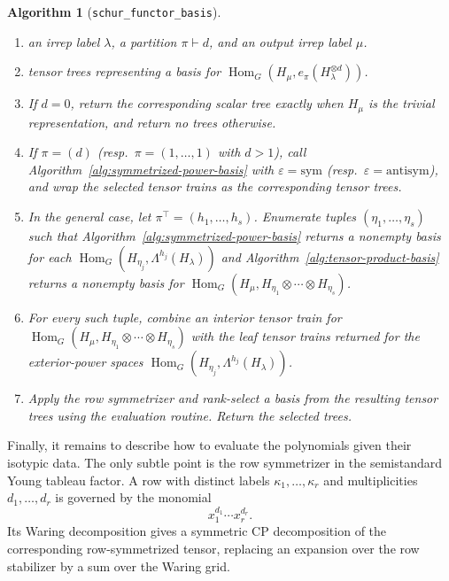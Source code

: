 \documentclass[11pt]{article}
\newcommand{\HomG}[2]{\operatorname{Hom}_G\!\left(#1,#2\right)}
\newtheorem{algorithm}[theorem]{Algorithm}
\theoremstyle{definition}
\begin{document}
\begin{algorithm}[\texttt{schur\_functor\_basis}]\label{alg:schur-functor-basis}\label{alg:appendix-leaf-assembly}
  \phantom{}
  \begin{enumerate}[label=\textbf{Step \arabic*.},leftmargin=2.8cm]
    \item[\textbf{Input:}] an irrep label $\lambda$, a partition $\pi\vdash d$, and an output irrep label $\mu$.
    \item[\textbf{Output:}] tensor trees representing a basis for $\HomG{H_\mu}{e_\pi(H_\lambda^{\otimes d})}$.
    \item If $d=0$, return the corresponding scalar tree exactly when $H_\mu$ is the trivial representation, and return no trees otherwise.
    \item If $\pi=(d)$ (resp.~$\pi=(1,\dots,1)$ with $d>1$), call Algorithm~\ref{alg:symmetrized-power-basis} with $\varepsilon=\mathrm{sym}$ (resp.~$\varepsilon=\mathrm{antisym}$), and wrap the selected tensor trains as the corresponding tensor trees.
    \item In the general case, let $\pi^\top=(h_1,\dots,h_s)$.  Enumerate tuples $(\eta_1,\dots,\eta_s)$ such that Algorithm~\ref{alg:symmetrized-power-basis} returns a nonempty basis for each $\HomG{H_{\eta_j}}{\Lambda^{h_j}(H_\lambda)}$ and Algorithm~\ref{alg:tensor-product-basis} returns a nonempty basis for $\HomG{H_\mu}{H_{\eta_1}\otimes\cdots\otimes H_{\eta_s}}$.
    \item For every such tuple, combine an interior tensor train for $\HomG{H_\mu}{H_{\eta_1}\otimes\cdots\otimes H_{\eta_s}}$ with the leaf tensor trains returned for the exterior-power spaces $\HomG{H_{\eta_j}}{\Lambda^{h_j}(H_\lambda)}$.
    \item Apply the row symmetrizer and rank-select a basis from the resulting tensor trees using the evaluation routine.  Return the selected trees.
  \end{enumerate}
\end{algorithm}



Finally, it remains to describe how to evaluate the polynomials given their isotypic data.  The only subtle point is the row symmetrizer in the semistandard Young tableau factor.  A row with distinct labels $\kappa_1,\dots,\kappa_r$ and multiplicities $d_1,\dots,d_r$ is governed by the monomial
\[
  x_1^{d_1}\cdots x_r^{d_r}.
\]
Its Waring decomposition gives a symmetric CP decomposition of the corresponding row-symmetrized tensor, replacing an expansion over the row stabilizer by a sum over the Waring grid.
\end{document}
